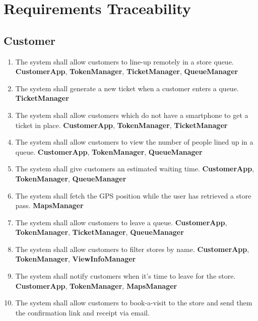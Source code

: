 \chapter{Requirements Traceability}
\section{Customer}
\begin{enumerate}[series=requirements, label=\textbf{R.\arabic*}]
	\item The system shall allow customers to line-up remotely in a store queue.
	\newline\textbf{CustomerApp}, \textbf{TokenManager}, \textbf{TicketManager}, \textbf{QueueManager}
	\item The system shall generate a new ticket when a customer enters a queue.
	\newline\textbf{TicketManager}
	\item The system shall allow customers which do not have a smartphone to get a ticket in place.
	\newline\textbf{CustomerApp}, \textbf{TokenManager}, \textbf{TicketManager}
	\item The system shall allow customers to view the number of people lined up in a queue.
	\newline\textbf{CustomerApp}, \textbf{TokenManager}, \textbf{QueueManager}
	\item The system shall give customers an estimated waiting time.
	\newline\textbf{CustomerApp}, \textbf{TokenManager}, \textbf{QueueManager}
	\item The system shall fetch the GPS position while the user has retrieved a store pass.
	\newline\textbf{MapsManager}
	\item The system shall allow customers to leave a queue.
	\newline\textbf{CustomerApp}, \textbf{TokenManager}, \textbf{TicketManager}, \textbf{QueueManager}
	\item The system shall allow customers to filter stores by name.
	\newline\textbf{CustomerApp}, \textbf{TokenManager}, \textbf{ViewInfoManager}
	\item The system shall notify customers when it's time to leave for the store.
	\newline\textbf{CustomerApp}, \textbf{TokenManager}, \textbf{MapsManager}
	\item The system shall allow customers to book-a-visit to the store and send them the confirmation link and receipt via email.

\end{enumerate}
